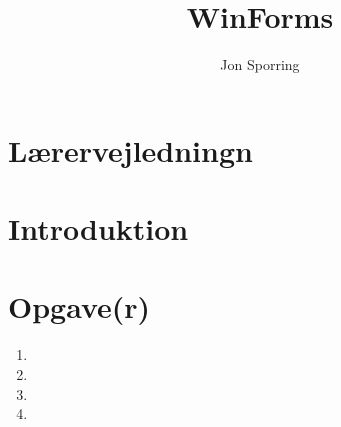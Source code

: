 \documentclass[a4paper,12pt]{article}
\title{WinForms}
\author{Jon Sporring}
\begin{document}
\maketitle

\section{Lærervejledningn}

\section{Introduktion}

\section{Opgave(r)}
\begin{enumerate}
\item 
\item 
\item 
\item 
\end{enumerate}
\end{document}
